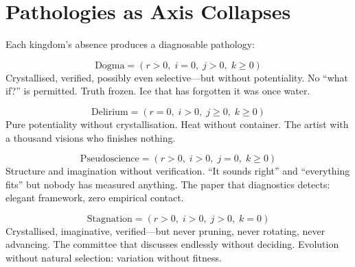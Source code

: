 \documentclass[11pt,a4paper]{article}
\newcommand{\rey}[1]{{\color{rcolor}#1}}
\newcommand{\imag}[1]{{\color{icolor}#1}}
\newcommand{\exac}[1]{{\color{jcolor}#1}}
\newcommand{\recu}[1]{{\color{kcolor}#1}}
\def\rey#1{#1}%
\def\imag#1{#1}%
\def\exac#1{#1}%
\def\recu#1{#1}%
\begin{document}
\section{Pathologies as Axis Collapses}
\label{sec:pathologies}

Each kingdom's absence produces a diagnosable pathology:

\begin{pathologybox}[title={Dogma ($\imag{i} = 0$)}]
\begin{equation}
\text{Dogma} = (\rey{r} > 0,\; \imag{i} = 0,\;
\exac{j} > 0,\; \recu{k} \geq 0)
\end{equation}
Crystallised, verified, possibly even selective---but without
potentiality. No ``what if?'' is permitted. Truth frozen.
Ice that has forgotten it was once water.
\end{pathologybox}

\begin{pathologybox}[title={Delirium ($\rey{r} = 0$)}]
\begin{equation}
\text{Delirium} = (\rey{r} = 0,\; \imag{i} > 0,\;
\exac{j} \geq 0,\; \recu{k} \geq 0)
\end{equation}
Pure potentiality without crystallisation.
Heat without container. The artist with a thousand visions who
finishes nothing.
\end{pathologybox}

\begin{pathologybox}[title={Pseudoscience ($\exac{j} = 0$)}]
\begin{equation}
\text{Pseudoscience} = (\rey{r} > 0,\; \imag{i} > 0,\;
\exac{j} = 0,\; \recu{k} \geq 0)
\end{equation}
Structure and imagination without verification.
``It sounds right'' and ``everything fits'' but nobody has
measured anything. The paper that diagnostics detects:
elegant framework, zero empirical contact.
\end{pathologybox}

\begin{pathologybox}[title={Stagnation ($\recu{k} = 0$)}]
\begin{equation}
\text{Stagnation} = (\rey{r} > 0,\; \imag{i} > 0,\;
\exac{j} > 0,\; \recu{k} = 0)
\end{equation}
Crystallised, imaginative, verified---but never pruning,
never rotating, never advancing. The committee that discusses
endlessly without deciding. Evolution without natural selection:
variation without fitness.
\end{pathologybox}
\end{document}
